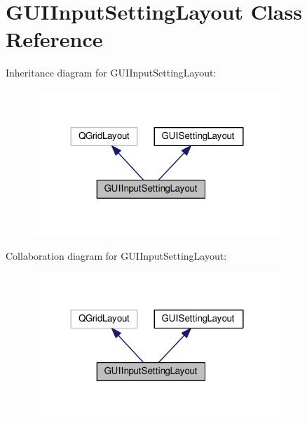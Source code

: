 \hypertarget{class_g_u_i_input_setting_layout}{}\section{G\+U\+I\+Input\+Setting\+Layout Class Reference}
\label{class_g_u_i_input_setting_layout}


Inheritance diagram for G\+U\+I\+Input\+Setting\+Layout\+:
\nopagebreak
\begin{figure}[H]
\begin{center}
\leavevmode
\includegraphics[width=264pt]{class_g_u_i_input_setting_layout__inherit__graph}
\end{center}
\end{figure}


Collaboration diagram for G\+U\+I\+Input\+Setting\+Layout\+:
\nopagebreak
\begin{figure}[H]
\begin{center}
\leavevmode
\includegraphics[width=264pt]{class_g_u_i_input_setting_layout__coll__graph}
\end{center}
\end{figure}
